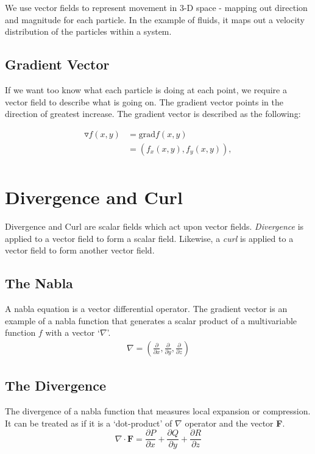 \documentclass[a4paper, 11pt]{article}
\begin{document}
We use vector fields to represent movement in 3-D space - mapping out direction and magnitude for each particle. In the example of fluids, it maps out a velocity distribution of the particles within a system. 

\subsection{Gradient Vector}
If we want too know what each particle is doing at each point, we require a vector field to describe what is going on. The gradient vector points in the direction of greatest increase. The gradient vector is described as the following: 

\begin{equation}
    \begin{split}
        \triangledown f(x,y) &= \mathrm{grad}f(x,y) \\ 
        &= (f_x(x,y), f_y(x,y)),   \\
    \end{split}
\end{equation}

\section{Divergence and Curl}
Divergence and Curl are scalar fields which act upon vector fields. \emph{Divergence} is applied to a vector field to form a scalar field. Likewise, a \emph{curl} is applied to a vector field to form another vector field. 

\subsection{The Nabla}
A nabla equation is a vector differential operator. The gradient vector is an example of a nabla function that generates a scalar product of a multivariable function $f$ with a vector `$\nabla$'.
\begin{equation}
    \begin{split}
        \nabla = \left(
            \frac{\partial}{\partial{x}}, \frac{\partial}{\partial{y}},\frac{\partial}{\partial{z}}
            \right)
    \end{split}
\end{equation}

\subsection{The Divergence}
The divergence of a nabla function that measures local expansion or compression. It can be treated as if it is a `dot-product' of $\nabla$ operator and the vector \textbf{F}.
\[
    \nabla \cdot \mathbf{F} = \frac{\partial{P}}{\partial{x}} + \frac{\partial{Q}}{\partial{y}} + \frac{\partial{R}}{\partial{z}}  
\]
\end{document}
